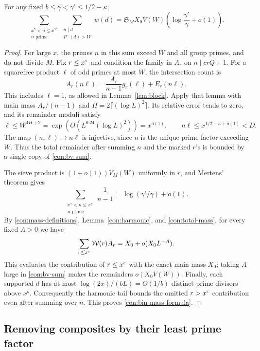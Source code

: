 \begin{lemma}\label{con:bin-mass}
For any fixed \(b\le\gamma<\gamma'\le1/2-\kappa\),
\begin{equation}\label{con:bin-mass-formula}
 \sum_{\substack{x^\gamma<n\le x^{\gamma'}\\n\text{ prime}}}
 \sum_{\substack{n\mid d\\P^-(d)>W}}w(d)
 =\mathfrak S_M X_0 V(W)
                  \left(\log\frac{\gamma'}\gamma+o(1)\right).
\end{equation}
\end{lemma}

\begin{proof}
For large \(x\), the primes \(n\) in this sum exceed \(W\) and
all group primes, and do not divide \(M\).  Fix \(r\le x^\varepsilon\)
and condition the family in \(A_r\) on \(n\mid crQ+1\).  For a
squarefree product \(\ell\) of odd primes at most \(W\), the
intersection count is
\[
 A_r(n\ell)=\frac{A_r}{n-1}g_r(\ell)+E_r(n\ell).
\]
This includes \(\ell=1\), as allowed in Lemma~\ref{lem:block}.
Apply that lemma with main mass \(A_r/(n-1)\) and
\(H=2\lceil(\log L)^2\rceil\).  Its relative error tends to zero,
and its remainder moduli satisfy
\[
 \ell\le W^{4H+2}=\exp(O(L^{0.24}(\log L)^2))=x^{o(1)},
 \qquad n\ell\le x^{1/2-\kappa+o(1)}<D.
\]
The map \((n,\ell)\mapsto n\ell\) is injective, since \(n\) is
the unique prime factor exceeding \(W\).  Thus the total remainder
after summing \(n\) and the marked \(r\)'s is bounded by a single
copy of \eqref{con:bv-sum}.

The sieve product is \((1+o(1))V_M(W)\) uniformly in \(r\), and
Mertens' theorem gives
\[
 \sum_{\substack{x^\gamma<n\le x^{\gamma'}\\n\text{ prime}}}
                      \frac1{n-1}=\log(\gamma'/\gamma)+o(1).
\]
By \eqref{con:mass-definitions}, Lemma~\ref{con:harmonic}, and
\eqref{con:total-mass}, for every fixed \(A>0\) we have
\[
 \sum_{r\le x^\varepsilon}\mathcal W(r)A_r
       =X_0+o(X_0L^{-A}).
\]
This evaluates the contribution of \(r\le x^\varepsilon\) with the exact
main mass \(X_0\); taking \(A\) large in \eqref{con:bv-sum}
makes the remainders \(o(X_0V(W))\).  Finally, each supported \(d\)
has at most \(\log(2x)/(bL)=O(1/b)\) distinct prime divisors above
\(x^b\).  Consequently the harmonic tail bounds the omitted
\(r>x^\varepsilon\) contribution even after summing over \(n\).
This proves \eqref{con:bin-mass-formula}.
\end{proof}

\subsection{Removing composites by their least prime factor}

